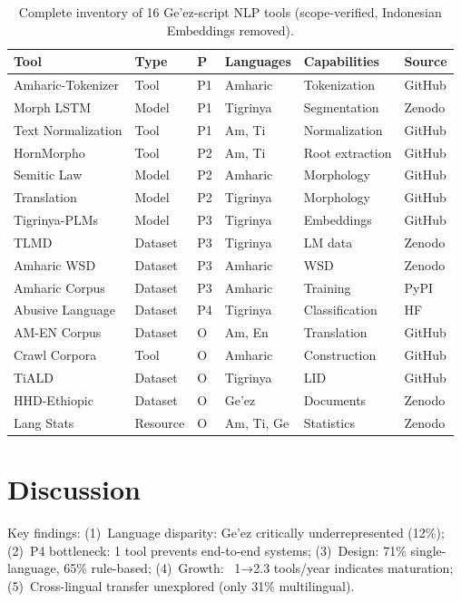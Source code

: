 \documentclass[12pt,a4paper]{article}
\theoremstyle{plain}
\theoremstyle{definition}
\begin{document}
\begin{table}[ht]
\centering
\caption{Complete inventory of 16 Ge'ez-script NLP tools (scope-verified, Indonesian Embeddings removed).}
\label{table:inventory}
\small
\begin{tabularx}{\textwidth}{|l|l|l|p{2.5cm}|p{2cm}|l|}
\hline
\textbf{Tool} & \textbf{Type} & \textbf{P} & \textbf{Languages} & \textbf{Capabilities} & \textbf{Source} \\
\hline
Amharic-Tokenizer & Tool & P1 & Amharic & Tokenization & GitHub \\
Morph LSTM & Model & P1 & Tigrinya & Segmentation & Zenodo \\
Text Normalization & Tool & P1 & Am, Ti & Normalization & GitHub \\
\hline
HornMorpho & Tool & P2 & Am, Ti & Root extraction & GitHub \\
Semitic Law & Model & P2 & Amharic & Morphology & GitHub \\
Translation & Model & P2 & Tigrinya & Morphology & GitHub \\
\hline
Tigrinya-PLMs & Model & P3 & Tigrinya & Embeddings & GitHub \\
TLMD & Dataset & P3 & Tigrinya & LM data & Zenodo \\
Amharic WSD & Dataset & P3 & Amharic & WSD & Zenodo \\
Amharic Corpus & Dataset & P3 & Amharic & Training & PyPI \\
\hline
Abusive Language & Dataset & P4 & Tigrinya & Classification & HF \\
\hline
AM-EN Corpus & Dataset & O & Am, En & Translation & GitHub \\
Crawl Corpora & Tool & O & Amharic & Construction & GitHub \\
TiALD & Dataset & O & Tigrinya & LID & GitHub \\
HHD-Ethiopic & Dataset & O & Ge'ez & Documents & Zenodo \\
Lang Stats & Resource & O & Am, Ti, Ge & Statistics & Zenodo \\
\hline
\end{tabularx}
\end{table}

\section{Discussion}

Key findings: (1)~Language disparity: Ge'ez critically underrepresented (12\%); (2)~P4 bottleneck: 1 tool prevents end-to-end systems; (3)~Design: 71\% single-language, 65\% rule-based; (4)~Growth: ~1→2.3 tools/year indicates maturation; (5)~Cross-lingual transfer unexplored (only 31\% multilingual).
\end{document}

